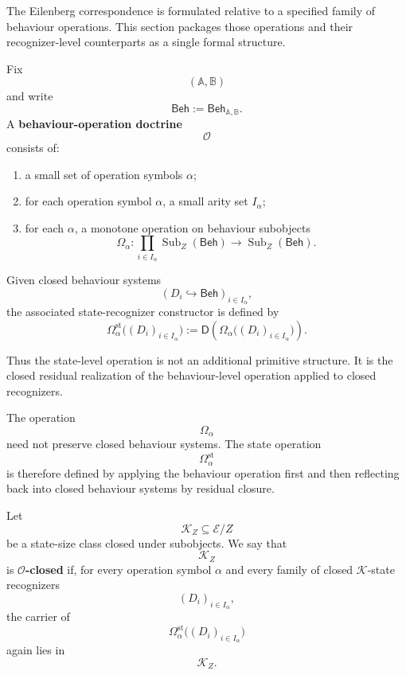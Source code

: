 The Eilenberg correspondence is formulated relative to a specified family of
behaviour operations. This section packages those operations and their
recognizer-level counterparts as a single formal structure.

\begin{definition}
\label{def:state-eilenberg-behaviour-operation-doctrine}
Fix
\[
(\mathbb A,\mathbb B)
\]
and write
\[
\mathsf{Beh}:=\mathsf{Beh}_{\mathbb A,\mathbb B}.
\]
A \textbf{behaviour-operation doctrine}
\[
\mathcal O
\]
consists of:
\begin{enumerate}
\item a small set of operation symbols \(\alpha\);
\item for each operation symbol \(\alpha\), a small arity set \(I_\alpha\);
\item for each \(\alpha\), a monotone operation on behaviour subobjects
\[
\Omega_\alpha:
\prod_{i\in I_\alpha}
\operatorname{Sub}_Z(\mathsf{Beh})
\to
\operatorname{Sub}_Z(\mathsf{Beh}).
\]
\end{enumerate}
Given closed behaviour systems
\[
(D_i\hookrightarrow\mathsf{Beh})_{i\in I_\alpha},
\]
the associated state-recognizer constructor is defined by
\[
\Omega_\alpha^{\mathrm{st}}
\bigl((D_i)_{i\in I_\alpha}\bigr)
:=
\mathsf D
\left(
\Omega_\alpha
\bigl((D_i)_{i\in I_\alpha}\bigr)
\right).
\]
\end{definition}

Thus the state-level operation is not an additional primitive structure. It
is the closed residual realization of the behaviour-level operation applied
to closed recognizers.

\begin{remark}
\label{rem:state-eilenberg-operations-need-not-preserve-closed}
The operation
\[
\Omega_\alpha
\]
need not preserve closed behaviour systems. The state operation
\[
\Omega_\alpha^{\mathrm{st}}
\]
is therefore defined by applying the behaviour operation first and then
reflecting back into closed behaviour systems by residual closure.
\end{remark}

\begin{definition}
\label{def:state-eilenberg-O-closed-state-size-class}
Let
\[
\mathcal K_Z\subseteq\mathcal E/Z
\]
be a state-size class closed under subobjects. We say that
\[
\mathcal K_Z
\]
is \textbf{\(\mathcal O\)-closed} if, for every operation symbol \(\alpha\)
and every family of closed \(\mathcal K\)-state recognizers
\[
(D_i)_{i\in I_\alpha},
\]
the carrier of
\[
\Omega_\alpha^{\mathrm{st}}
\bigl((D_i)_{i\in I_\alpha}\bigr)
\]
again lies in
\[
\mathcal K_Z.
\]
\end{definition}

